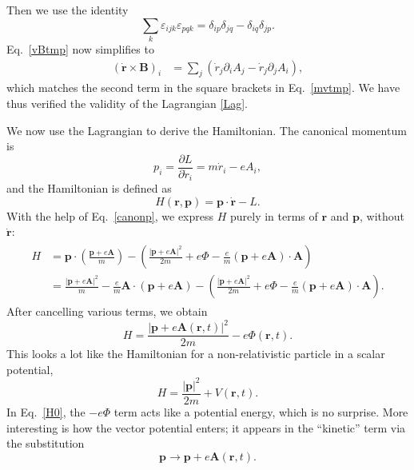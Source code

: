 \documentclass[prx,12pt]{revtex4-2}
\begin{document}
Then we use the identity
\begin{equation}
  \sum_k \varepsilon_{ijk} \varepsilon_{pqk}
  = \delta_{ip} \delta_{jq} - \delta_{iq} \delta_{jp}.
\end{equation}
Eq.~\eqref{vBtmp} now simplifies to
\begin{align}
  (\dot{\mathbf{r}} \times \mathbf{B})_i
  &= \sum_{j} \left( \dot{r}_j  \partial_i A_j - \dot{r}_j  \partial_j A_i\right),
\end{align}
which matches the second term in the square brackets in
Eq.~\eqref{mvtmp}.  We have thus verified the validity of the
Lagrangian \eqref{Lag}.

We now use the Lagrangian to derive the Hamiltonian.  The canonical
momentum is
\begin{equation}
  p_i = \frac{\partial L}{\partial \dot{r}_i} = m\dot{r}_i - e A_i,
  \label{canonp}
\end{equation}
and the Hamiltonian is defined as
\begin{equation}
  H(\mathbf{r},\mathbf{p}) = \mathbf{p} \cdot \dot{\mathbf{r}} - L.
\end{equation}
With the help of Eq.~\eqref{canonp}, we express $H$ purely in terms of
$\mathbf{r}$ and $\mathbf{p}$, without $\dot{\mathbf{r}}$:
\begin{align}
  \begin{aligned}
    H &= \mathbf{p}\cdot \left(\frac{\mathbf{p}+e\mathbf{A}}{m}\right)
    - \left(\frac{|\mathbf{p}+e\mathbf{A}|^2}{2m}
    + e\Phi - \frac{e}{m}(\mathbf{p}+e\mathbf{A})\cdot \mathbf{A}\right) \\
    &= \frac{|\mathbf{p}+e\mathbf{A}|^2}{m}
    - \frac{e}{m}\mathbf{A}\cdot \left(\mathbf{p}+e\mathbf{A}\right)
    - \left(\frac{|\mathbf{p}+e\mathbf{A}|^2}{2m}
    + e\Phi - \frac{e}{m}(\mathbf{p}+e\mathbf{A})\cdot \mathbf{A}\right).
  \end{aligned}
\end{align}
After cancelling various terms, we obtain
\begin{equation}
  H = \frac{|\mathbf{p}+e\mathbf{A}(\mathbf{r},t)|^2}{2m} - e\Phi(\mathbf{r},t).
  \label{H0}
\end{equation}
This looks a lot like the Hamiltonian for a non-relativistic particle
in a scalar potential,
\begin{equation*}
  H = \frac{|\mathbf{p}|^2}{2m} + V(\mathbf{r},t).
\end{equation*}
In Eq.~\eqref{H0}, the $-e\Phi$ term acts like a potential energy,
which is no surprise.  More interesting is how the vector potential
enters; it appears in the ``kinetic'' term via the substitution
\begin{equation}
  \mathbf{p} \rightarrow \mathbf{p} + e\mathbf{A}(\mathbf{r},t).  
\end{equation}
\end{document}
